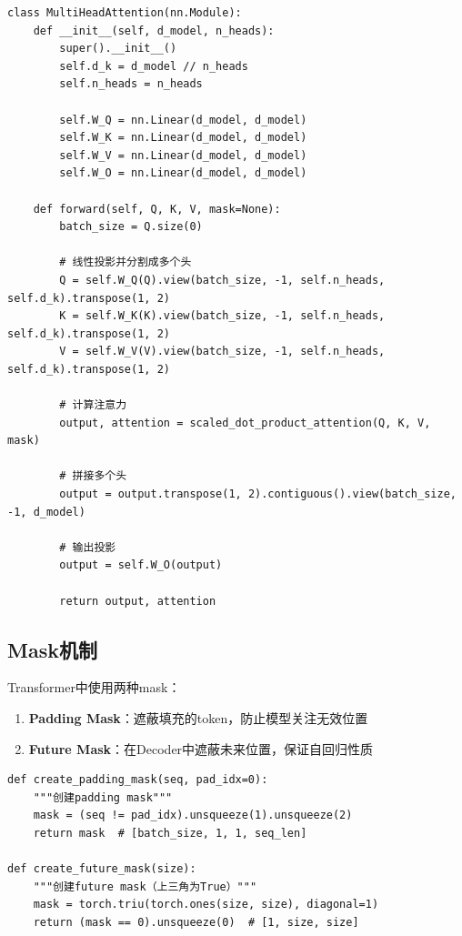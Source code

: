 \documentclass[UTF8,12pt,a4paper]{ctexart}
\begin{document}
\begin{lstlisting}[caption=多头注意力实现（简化版）]
class MultiHeadAttention(nn.Module):
    def __init__(self, d_model, n_heads):
        super().__init__()
        self.d_k = d_model // n_heads
        self.n_heads = n_heads
        
        self.W_Q = nn.Linear(d_model, d_model)
        self.W_K = nn.Linear(d_model, d_model)
        self.W_V = nn.Linear(d_model, d_model)
        self.W_O = nn.Linear(d_model, d_model)
    
    def forward(self, Q, K, V, mask=None):
        batch_size = Q.size(0)
        
        # 线性投影并分割成多个头
        Q = self.W_Q(Q).view(batch_size, -1, self.n_heads, self.d_k).transpose(1, 2)
        K = self.W_K(K).view(batch_size, -1, self.n_heads, self.d_k).transpose(1, 2)
        V = self.W_V(V).view(batch_size, -1, self.n_heads, self.d_k).transpose(1, 2)
        
        # 计算注意力
        output, attention = scaled_dot_product_attention(Q, K, V, mask)
        
        # 拼接多个头
        output = output.transpose(1, 2).contiguous().view(batch_size, -1, d_model)
        
        # 输出投影
        output = self.W_O(output)
        
        return output, attention
\end{lstlisting}

\subsection{Mask机制}

Transformer中使用两种mask：

\begin{enumerate}
    \item \textbf{Padding Mask}：遮蔽填充的token，防止模型关注无效位置
    \item \textbf{Future Mask}：在Decoder中遮蔽未来位置，保证自回归性质
\end{enumerate}

\begin{lstlisting}[caption=Mask创建函数]
def create_padding_mask(seq, pad_idx=0):
    """创建padding mask"""
    mask = (seq != pad_idx).unsqueeze(1).unsqueeze(2)
    return mask  # [batch_size, 1, 1, seq_len]

def create_future_mask(size):
    """创建future mask（上三角为True）"""
    mask = torch.triu(torch.ones(size, size), diagonal=1)
    return (mask == 0).unsqueeze(0)  # [1, size, size]
\end{lstlisting}
\end{document}

